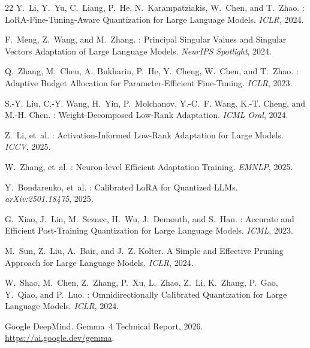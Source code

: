 \documentclass[11pt,a4paper]{article}
\begin{document}
\begin{thebibliography}{22}
Y.~Li, Y.~Yu, C.~Liang, P.~He, N.~Karampatziakis, W.~Chen, and T.~Zhao.
: {LoRA}-Fine-Tuning-Aware Quantization for Large Language Models.
\newblock \emph{ICLR}, 2024.

F.~Meng, Z.~Wang, and M.~Zhang.
: Principal Singular Values and Singular Vectors Adaptation of Large Language Models.
\newblock \emph{NeurIPS Spotlight}, 2024.

Q.~Zhang, M.~Chen, A.~Bukharin, P.~He, Y.~Cheng, W.~Chen, and T.~Zhao.
: Adaptive Budget Allocation for Parameter-Efficient Fine-Tuning.
\newblock \emph{ICLR}, 2023.

S.-Y. Liu, C.-Y. Wang, H.~Yin, P.~Molchanov, Y.-C.~F. Wang, K.-T. Cheng, and M.-H. Chen.
: Weight-Decomposed Low-Rank Adaptation.
\newblock \emph{ICML Oral}, 2024.

Z.~Li, et~al.
: Activation-Informed Low-Rank Adaptation for Large Models.
\newblock \emph{ICCV}, 2025.

W.~Zhang, et~al.
: Neuron-level Efficient Adaptation Training.
\newblock \emph{EMNLP}, 2025.

Y.~Bondarenko, et~al.
: Calibrated {LoRA} for Quantized {LLMs}.
\newblock \emph{arXiv:2501.18475}, 2025.

G.~Xiao, J.~Lin, M.~Seznec, H.~Wu, J.~Demouth, and S.~Han.
: Accurate and Efficient Post-Training Quantization for Large Language Models.
\newblock \emph{ICML}, 2023.

M.~Sun, Z.~Liu, A.~Bair, and J.~Z. Kolter.
\newblock A Simple and Effective Pruning Approach for Large Language Models.
\newblock \emph{ICLR}, 2024.

W.~Shao, M.~Chen, Z.~Zhang, P.~Xu, L.~Zhao, Z.~Li, K.~Zhang, P.~Gao, Y.~Qiao, and P.~Luo.
: Omnidirectionally Calibrated Quantization for Large Language Models.
\newblock \emph{ICLR}, 2024.

{Google DeepMind}.
\newblock Gemma~4 Technical Report, 2026.
\newblock \url{https://ai.google.dev/gemma}.


\end{thebibliography}
\end{document}

